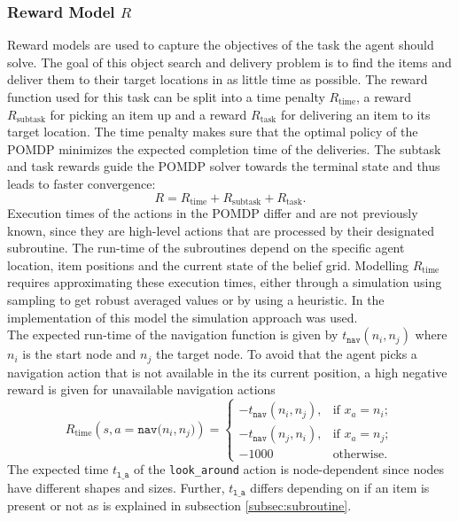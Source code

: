 \subsubsection{Reward Model $R$}
Reward models are used to capture the objectives of the task the agent should solve. The goal of this object search and delivery problem is to find the items and deliver them to their target locations in as little time as possible. The reward function used for this task can be split into a time penalty $R_\text{time}$, a reward  $R_\text{subtask}$ for picking an item up and a reward $R_\text{task}$ for delivering an item to its target location. The time penalty makes sure that the optimal policy of the POMDP minimizes the expected completion time of the deliveries. The subtask and task rewards guide the POMDP solver towards the terminal state and thus leads to faster convergence:
\begin{equation}
    R = R_{\text{time}} + R_{\text{subtask}} + R_{\text{task}}.
\end{equation}
Execution times of the actions in the POMDP differ and are not previously known, since they are high-level actions that are processed by their designated subroutine. The run-time of the subroutines depend on the specific agent location, item positions and the current state of the belief grid. Modelling $R_\text{time}$ requires approximating these execution times, either through a simulation using sampling to get robust averaged values or by using a heuristic. In the implementation of this model the simulation approach was used.\\
The expected run-time of the navigation function is given by $t_\texttt{nav}(n_i, n_j)$ where $n_i$ is the start node and $n_j$ the target node. To avoid that the agent picks a navigation action that is not available in the its current position, a high negative reward is given for unavailable navigation actions
\begin{equation}
    R_\text{time}(s, a=\texttt{nav($n_i, n_j$)}) = \begin{cases}
    -t_\texttt{nav}(n_i, n_j), & \text{if } x_a=n_i;\\
    -t_\texttt{nav}(n_j, n_i), & \text{if } x_a=n_j;\\
    -1000 & \text{otherwise}.
    \end{cases}
\end{equation}
The expected time $t_\texttt{l\_a}$ of the \texttt{look\_around} action is node-dependent since nodes have different shapes and sizes. Further, $t_\texttt{l\_a}$ differs depending on if an item is present or not as is explained in subsection \ref{subsec:subroutine}. 
